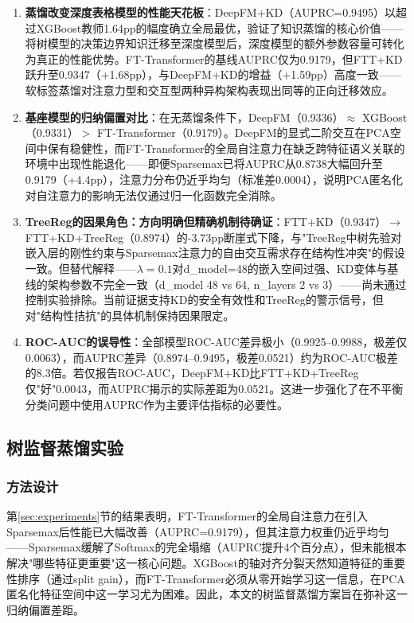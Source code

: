 \begin{enumerate}
    \item \textbf{蒸馏改变深度表格模型的性能天花板}：DeepFM+KD（AUPRC=0.9495）以超过XGBoost教师1.64pp的幅度确立全局最优，验证了知识蒸馏的核心价值——将树模型的决策边界知识迁移至深度模型后，深度模型的额外参数容量可转化为真正的性能优势。FT-Transformer的基线AUPRC仅为0.9179，但FTT+KD跃升至0.9347（+1.68pp），与DeepFM+KD的增益（+1.59pp）高度一致——软标签蒸馏对注意力型和交互型两种异构架构表现出同等的正向迁移效应。
    \item \textbf{基座模型的归纳偏置对比}：在无蒸馏条件下，DeepFM（0.9336）$\approx$ XGBoost（0.9331）$>$ FT-Transformer（0.9179）。DeepFM的显式二阶交互在PCA空间中保有稳健性，而FT-Transformer的全局自注意力在缺乏跨特征语义关联的环境中出现性能退化——即便Sparsemax已将AUPRC从0.8738大幅回升至0.9179（+4.4pp），注意力分布仍近乎均匀（标准差0.0004），说明PCA匿名化对自注意力的影响无法仅通过归一化函数完全消除。
    \item \textbf{TreeReg的因果角色：方向明确但精确机制待确证}：FTT+KD（0.9347）$\rightarrow$ FTT+KD+TreeReg（0.8974）的-3.73pp断崖式下降，与"TreeReg中树先验对嵌入层的刚性约束与Sparsemax注意力的自由交互需求存在结构性冲突"的假设一致。但替代解释——$\lambda{=}0.1$对d\_model{=}48的嵌入空间过强、KD变体与基线的架构参数不完全一致（d\_model 48 vs 64, n\_layers 2 vs 3）——尚未通过控制实验排除。当前证据支持KD的安全有效性和TreeReg的警示信号，但对"结构性拮抗"的具体机制保持因果限定。
    \item \textbf{ROC-AUC的误导性}：全部模型ROC-AUC差异极小（0.9925--0.9988，极差仅0.0063），而AUPRC差异（0.8974--0.9495，极差0.0521）约为ROC-AUC极差的8.3倍。若仅报告ROC-AUC，DeepFM+KD比FTT+KD+TreeReg仅"好"0.0043，而AUPRC揭示的实际差距为0.0521。这进一步强化了在不平衡分类问题中使用AUPRC作为主要评估指标的必要性。
\end{enumerate}

\subsection{树监督蒸馏实验}

\subsubsection{方法设计}

第\ref{sec:experiments}节的结果表明，FT-Transformer的全局自注意力在引入Sparsemax后性能已大幅改善（AUPRC=0.9179），但其注意力权重仍近乎均匀——Sparsemax缓解了Softmax的完全塌缩（AUPRC提升4个百分点），但未能根本解决"哪些特征更重要"这一核心问题。XGBoost的轴对齐分裂天然知道特征的重要性排序（通过split gain），而FT-Transformer必须从零开始学习这一信息，在PCA匿名化特征空间中这一学习尤为困难。因此，本文的树监督蒸馏方案旨在弥补这一归纳偏置差距。

